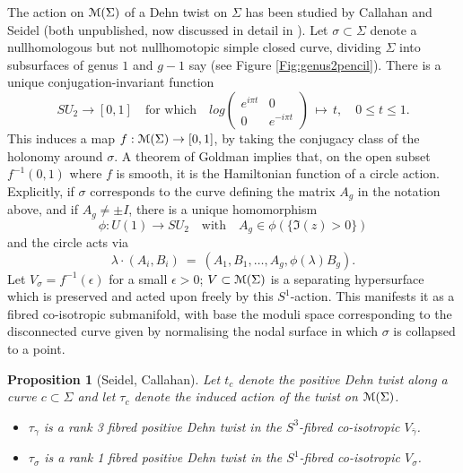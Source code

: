 \documentclass[reqno,10pt]{amsart}
\numberwithin{equation}{section}
\newcommand{\scrM}{\EuScript{M}}
\newtheorem{Proposition}[thm]{Proposition}
\theoremstyle{remark}
\begin{document}
The action on $\scrM(\Sigma)$ of a Dehn twist on $\Sigma$ has been studied by Callahan and Seidel (both unpublished, now discussed in detail in \cite{WW:triangle}). 
Let $\sigma \subset \Sigma$ denote a nullhomologous but not nullhomotopic simple closed curve, dividing $\Sigma$ into subsurfaces of genus $1$ and $g-1$ say (see Figure \ref{Fig:genus2pencil}).
There is a unique conjugation-invariant function
\[
SU_2 \longrightarrow [0,1] \quad \textrm{for which} \quad  log\left( \begin{array}{cc} e^{i\pi t} & 0 \\ 0 & e^{-i\pi t}  \end{array}\right) \, \mapsto \, t, \quad 0\leq t \leq 1.
\]
This induces a map $f: \scrM(\Sigma) \rightarrow [0,1]$, by taking the conjugacy class of the holonomy around  $\sigma$.  A theorem of Goldman \cite{Goldman} implies that, on the open subset $f^{-1}(0,1)$ where $f$ is smooth, it is the Hamiltonian function of a circle action. Explicitly, if $\sigma$ corresponds to the curve defining the matrix $A_g$ in the notation above, and if $A_g \neq \pm I$, there is a unique homomorphism 
\[
\phi: U(1) \rightarrow SU_2 \quad \textrm{with} \quad A_g \in \phi(\{ \Im(z) > 0 \} )
\] and the circle acts via
\[
\lambda \cdot (A_i, B_i) \ = \ (A_1, B_1, \ldots, A_g, \phi(\lambda)B_g).
\]  
Let $V_{\sigma}=f^{-1}(\epsilon)$ for a small $\epsilon > 0$; $V\subset \scrM(\Sigma)$ is a separating hypersurface which is preserved and acted upon freely by this  $S^1$-action.  This manifests it as a fibred co-isotropic submanifold, with base the moduli space corresponding to  the disconnected curve given by normalising  the nodal surface in which $\sigma$ is collapsed to a point.

\begin{Proposition}[Seidel, Callahan] \label{Prop:SeidelCallahan}
Let $t_{c}$ denote the positive Dehn twist along a curve $c\subset \Sigma$ and let $\tau_c$ denote the induced action of the twist on $\scrM(\Sigma)$.  
\begin{itemize}
\item $\tau_{\gamma}$ is a rank 3 fibred positive Dehn twist in the $S^3$-fibred co-isotropic $V_{\bar\gamma}$.
\item $\tau_{\sigma}$  is a rank 1 fibred positive Dehn twist in the $S^1$-fibred co-isotropic  $V_{\sigma}$.
\end{itemize}
\end{Proposition}
\end{document}
